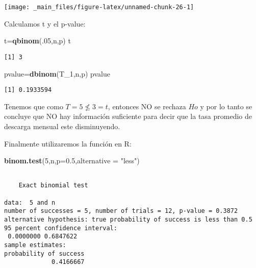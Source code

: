 \documentclass[a4paper,oneside,openany]{book}
\newenvironment{Shaded}{\begin{snugshade}}{\end{snugshade}}
\newcommand{\KeywordTok}[1]{\textcolor[rgb]{0.13,0.29,0.53}{\textbf{#1}}}
\newcommand{\DataTypeTok}[1]{\textcolor[rgb]{0.13,0.29,0.53}{#1}}
\newcommand{\DecValTok}[1]{\textcolor[rgb]{0.00,0.00,0.81}{#1}}
\newcommand{\FloatTok}[1]{\textcolor[rgb]{0.00,0.00,0.81}{#1}}
\newcommand{\StringTok}[1]{\textcolor[rgb]{0.31,0.60,0.02}{#1}}
\newcommand{\NormalTok}[1]{#1}
\begin{document}
\begin{center}\texttt{[image: \_main\_files/figure-latex/unnamed-chunk-26-1]} \end{center}

Calculamos t y el p-value:

\begin{Shaded}
\begin{Highlighting}[]
\NormalTok{t=}\KeywordTok{qbinom}\NormalTok{(.}\DecValTok{05}\NormalTok{,n,p)}
\NormalTok{t}
\end{Highlighting}
\end{Shaded}

\begin{verbatim}
[1] 3
\end{verbatim}

\begin{Shaded}
\begin{Highlighting}[]
\NormalTok{pvalue=}\KeywordTok{dbinom}\NormalTok{(T_}\DecValTok{1}\NormalTok{,n,p)}
\NormalTok{pvalue}
\end{Highlighting}
\end{Shaded}

\begin{verbatim}
[1] 0.1933594
\end{verbatim}

Tenemos que como \(T=5\nleq 3 =t\), entonces NO se rechaza \(Ho\) y por
lo tanto se concluye que NO hay información suficiente para decir que la
tasa promedio de descarga mensual este disminuyendo.

Finalmente utilizaremos la función en R:

\begin{Shaded}
\begin{Highlighting}[]
\KeywordTok{binom.test}\NormalTok{(}\DecValTok{5}\NormalTok{,n,}\DataTypeTok{p=}\FloatTok{0.5}\NormalTok{,}\DataTypeTok{alternative =} \StringTok{"less"}\NormalTok{)}
\end{Highlighting}
\end{Shaded}

\begin{verbatim}

    Exact binomial test

data:  5 and n
number of successes = 5, number of trials = 12, p-value = 0.3872
alternative hypothesis: true probability of success is less than 0.5
95 percent confidence interval:
 0.0000000 0.6847622
sample estimates:
probability of success 
             0.4166667 
\end{verbatim}
\end{document}
